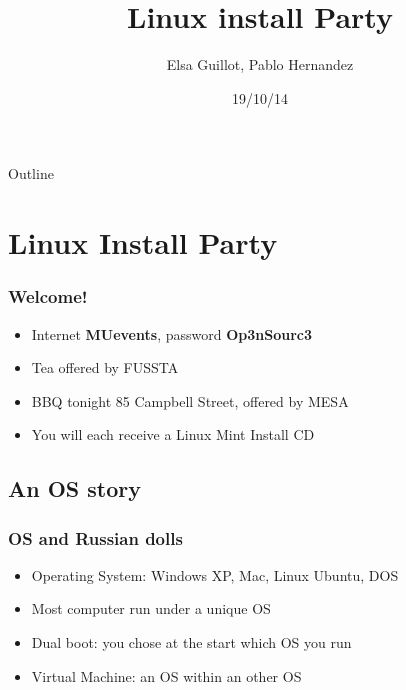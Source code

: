 \documentclass{beamer}
\title[Open Source Workshop (beamer)]{Linux install Party}
\author[Elsa, Pablo]{Elsa Guillot, Pablo Hernandez}
\institute[IFS]{IFS, Massey University}
\date{19/10/14}
\begin{document}
\begin{frame}
  \titlepage
\end{frame}

\begin{frame}{Outline}
  \tableofcontents
\end{frame}

\section{Linux Install Party}
\begin{frame}
\frametitle{Welcome!}
\begin{itemize}
\item Internet \textbf{MUevents}, password \textbf{Op3nSourc3}
\item Tea offered by FUSSTA
\item BBQ tonight 85 Campbell Street, offered by MESA
\item You will each receive a Linux Mint Install CD
\end{itemize}
\end{frame}

\subsection{An OS story}
\begin{frame}
\frametitle{OS and Russian dolls}
\begin{itemize}
  \item Operating System: Windows XP, Mac, Linux Ubuntu, DOS
  \item Most computer run under a unique OS
  \item Dual boot: you chose at the start which OS you run
  \item Virtual Machine: an OS within an other OS
\end{itemize}
\end{frame}
\end{document}

